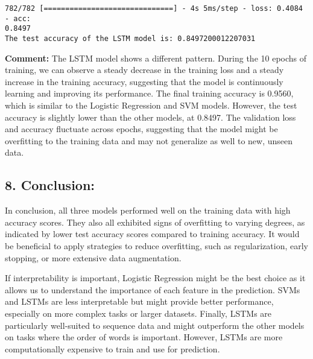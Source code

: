 \documentclass[11pt]{article}
\begin{document}
    \begin{Verbatim}[commandchars=\\\{\}]
782/782 [==============================] - 4s 5ms/step - loss: 0.4084 - acc:
0.8497
The test accuracy of the LSTM model is: 0.8497200012207031
    \end{Verbatim}

    \textbf{Comment:} The LSTM model shows a different pattern. During the
10 epochs of training, we can observe a steady decrease in the training
loss and a steady increase in the training accuracy, suggesting that the
model is continuously learning and improving its performance. The final
training accuracy is 0.9560, which is similar to the Logistic Regression
and SVM models. However, the test accuracy is slightly lower than the
other models, at 0.8497. The validation loss and accuracy fluctuate
across epochs, suggesting that the model might be overfitting to the
training data and may not generalize as well to new, unseen data.

    \hypertarget{conclusion}{%
\subsection{8. Conclusion:}\label{conclusion}}

In conclusion, all three models performed well on the training data with
high accuracy scores. They also all exhibited signs of overfitting to
varying degrees, as indicated by lower test accuracy scores compared to
training accuracy. It would be beneficial to apply strategies to reduce
overfitting, such as regularization, early stopping, or more extensive
data augmentation.

If interpretability is important, Logistic Regression might be the best
choice as it allows us to understand the importance of each feature in
the prediction. SVMs and LSTMs are less interpretable but might provide
better performance, especially on more complex tasks or larger datasets.
Finally, LSTMs are particularly well-suited to sequence data and might
outperform the other models on tasks where the order of words is
important. However, LSTMs are more computationally expensive to train
and use for prediction.


    
    
    
\end{document}
